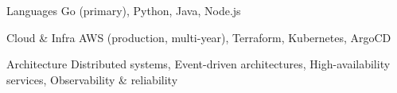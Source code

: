 
\begin{cvskills}

  \cvskill
    {Languages}
    {Go (primary), Python, Java, Node.js}

  \cvskill
    {Cloud \& Infra}
    {AWS (production, multi-year), Terraform, Kubernetes, ArgoCD}

  \cvskill
    {Architecture}
    {Distributed systems, Event-driven architectures, High-availability services, Observability \& reliability}

\end{cvskills}
